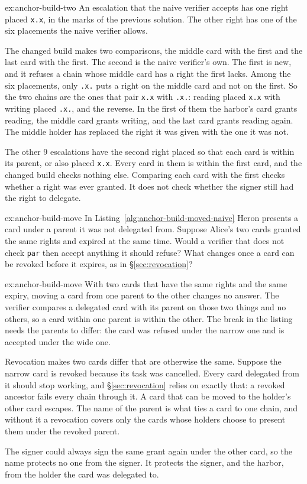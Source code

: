 \documentclass[11pt,a4paper]{article}
\theoremstyle{definition}
\begin{document}
\begin{pdsolution}{ex:anchor-build-two}
An escalation that the naive verifier accepts has one right placed \texttt{x.x}, in the marks of the previous solution. The other right has one of the six placements the naive verifier allows.

The changed build makes two comparisons, the middle card with the first and the last card with the first. The second is the naive verifier's own. The first is new, and it refuses a chain whose middle card has a right the first lacks. Among the six placements, only \texttt{.x.} puts a right on the middle card and not on the first. So the two chains are the ones that pair \texttt{x.x} with \texttt{.x.}: reading placed \texttt{x.x} with writing placed \texttt{.x.}, and the reverse. In the first of them the harbor's card grants reading, the middle card grants writing, and the last card grants reading again. The middle holder has replaced the right it was given with the one it was not.

The other 9 escalations have the second right placed so that each card is within its parent, or also placed \texttt{x.x}. Every card in them is within the first card, and the changed build checks nothing else. Comparing each card with the first checks whether a right was ever granted. It does not check whether the signer still had the right to delegate.
\end{pdsolution}
\begin{pdexercise}[kind=Open,rating=3]{ex:anchor-build-move}
In Listing~\ref{alg:anchor-build-moved-naive} Heron presents a card under a parent it was not delegated from. Suppose Alice's two cards granted the same rights and expired at the same time. Would a verifier that does not check \texttt{par} then accept anything it should refuse? What changes once a card can be revoked before it expires, as in \S\ref{sec:revocation}?
\end{pdexercise}
\begin{pdsolution}{ex:anchor-build-move}
With two cards that have the same rights and the same expiry, moving a card from one parent to the other changes no answer. The verifier compares a delegated card with its parent on those two things and no others, so a card within one parent is within the other. The break in the listing needs the parents to differ: the card was refused under the narrow one and is accepted under the wide one.

Revocation makes two cards differ that are otherwise the same. Suppose the narrow card is revoked because its task was cancelled. Every card delegated from it should stop working, and \S\ref{sec:revocation} relies on exactly that: a revoked ancestor fails every chain through it. A card that can be moved to the holder's other card escapes. The name of the parent is what ties a card to one chain, and without it a revocation covers only the cards whose holders choose to present them under the revoked parent.

The signer could always sign the same grant again under the other card, so the name protects no one from the signer. It protects the signer, and the harbor, from the holder the card was delegated to.
\end{pdsolution}
\end{document}
